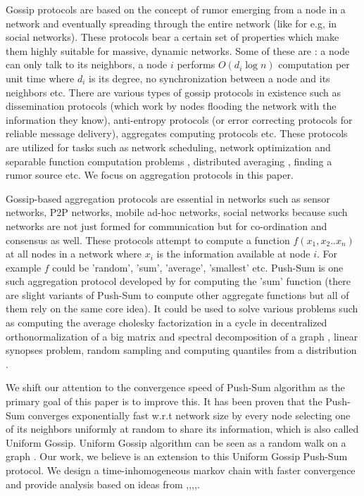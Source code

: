 \documentclass{article}
\begin{document}
Gossip protocols are based on the concept of rumor emerging from a node in a network and eventually spreading through the entire network (like for e.g, in social networks). These protocols bear a certain set of properties which make them highly suitable for massive, dynamic networks. Some of these are \citep{Shah}: a node can only talk to its neighbors, a node $i$ performs $O(d_i \log n)$ computation per unit time where $d_i$ is its degree, no synchronization between a node and its neighbors etc. There are various types of gossip protocols in existence such as dissemination protocols (which work by nodes flooding the network with the information they know), anti-entropy protocols (or error correcting protocols for reliable message delivery), aggregates computing protocols etc. These protocols are utilized for tasks such as network scheduling, network optimization and separable function computation problems \citep{Shah}, distributed averaging \cite{rajagopalan2011distributed}, finding a rumor source \cite{shah2011rumors} etc. We focus on aggregation protocols in this paper. 

Gossip-based aggregation protocols are essential in networks such as sensor networks, P2P networks, mobile ad-hoc networks, social networks because such networks are not just formed for communication but for co-ordination and consensus as well. These protocols attempt to compute a function $f(x_1,x_2..x_n)$ at all nodes in a network where $x_i$ is the information available at node $i$. For example $f$ could be 'random', 'sum', 'average', 'smallest' etc. Push-Sum is one such aggregation protocol developed by \citep{Kempe03gossip-basedcomputation} for computing the 'sum' function (there are slight variants of Push-Sum to compute other aggregate functions but all of them rely on the same core idea). It could be used to solve various problems such as computing the average cholesky factorization in a cycle in decentralized orthonormalization of a big matrix and spectral decomposition of a graph \cite{kempe2008decentralized}, linear synopses problem, random sampling and computing quantiles from a distribution \cite{Kempe03gossip-basedcomputation}.

We shift our attention to the convergence speed of Push-Sum algorithm as the primary goal of this paper is to improve this. It has been proven that the Push-Sum converges exponentially fast w.r.t network size by every node selecting one of its neighbors uniformly at random to share its information, which is also called Uniform Gossip. Uniform Gossip algorithm can be seen as a random walk on a graph \cite{lovasz1993random}. Our work, we believe is an extension to this Uniform Gossip Push-Sum protocol. We design a time-inhomogeneous markov chain with faster convergence and provide analysis based on ideas from \cite{douc2004quantitative},\cite{saloff2007convergence},\cite{saloff2009merging},\cite{saloff2010time},\cite{saloff2010merging}.
\end{document}
